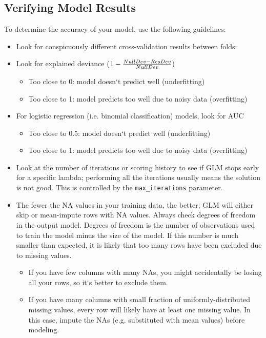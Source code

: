 \newpage
\subsection{Verifying Model Results}

To determine the accuracy of your model, use the following guidelines: 

\begin{itemize}
\item Look for conspicuously different cross-validation results between folds:

\waterExampleInR



\waterExampleInPython


\item Look for explained deviance ($1 - {NullDev - ResDev \over NullDev}$) 
      \begin{itemize}
      \item Too close to 0:  model doesn`t predict well (underfitting)
      \item Too close to 1:  model predicts too well due to noisy data (overfitting)
      \end{itemize}


\item For logistic regression (i.e. binomial classification) models, look for AUC
      \begin{itemize}
      \item Too close to 0.5:  model doesn`t predict well (underfitting)
      \item Too close to 1:  model predicts too well due to noisy data (overfitting)
      \end{itemize}
\item Look at the number of iterations  or scoring history to see if GLM stops early for a specific
      lambda; performing all the iterations usually means the solution is not good.  This is
      controlled by the \texttt{max\_iterations} parameter.
\item The fewer the NA values in your training data, the better; GLM will either skip or mean-impute rows with NA values. Always check degrees of freedom in the output model. Degrees of freedom is the number of observations used to train the model minus the size of the model. If this number is much smaller than expected, it is likely that too many rows have been excluded due to missing values. 

      \begin{itemize}
      \item If you have few columns with many NAs, you might accidentally be losing all your rows, so it`s better to exclude them.
      \item If you have many columns with small fraction of uniformly-distributed missing values, every row will likely have at least one missing value. In this case, impute the NAs (e.g. substituted with mean values) before modeling.
      \end{itemize}
\end{itemize}

